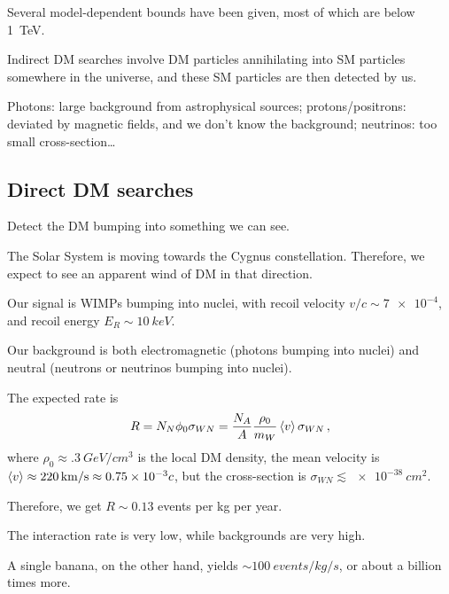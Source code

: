\documentclass[main.tex]{subfiles}
\begin{document}
Several model-dependent bounds have been given, most of which are below \SI{1}{TeV}. 

Indirect DM searches involve DM particles annihilating into SM particles somewhere in the universe, and these SM particles are then detected by us.  

Photons: large background from astrophysical sources; protons/positrons: deviated by magnetic fields, and we don't know the background; neutrinos: too small cross-section\dots


\subsection{Direct DM searches}

Detect the DM bumping into something we can see. 

The Solar System is moving towards the Cygnus constellation. 
Therefore, we expect to see an apparent wind of DM in that direction.


Our signal is WIMPs bumping into nuclei, with recoil velocity \(v/c \sim \num{7e-4}\), and recoil energy \(E_R \sim \SI{10}{keV}\).

Our background is both electromagnetic (photons bumping into nuclei) and neutral (neutrons or neutrinos bumping into nuclei). 

The expected rate is 
%
\begin{align}
R = N_N \phi_0 \sigma_{WN} = \frac{N_A}{A} \frac{\rho_0 }{m_W} \expval{v} \sigma_{WN}
\,,
\end{align}
%
where \(\rho_0 \approx \SI{.3}{GeV / cm^3}\) is the local DM density, the mean velocity is \(\expval{v} \approx \SI{220}{km/s} \approx \num{.75e-3} c\), but the cross-section is \(\sigma_{WN} \lesssim \SI{e-38}{cm^2}\).

Therefore, we get \(R \sim \num{0.13}\) events per kg per year. 

The interaction rate is very low, while backgrounds are very high.

A single banana, on the other hand, yields \(\sim \SI{100}{events/kg/s}\), or about a billion times more.

\end{document}
